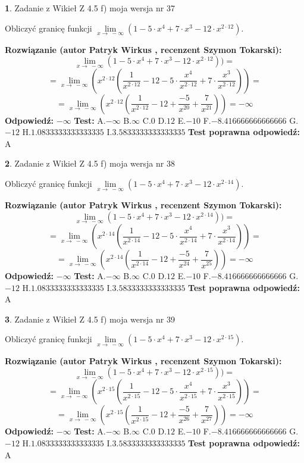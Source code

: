 \documentclass[12pt, a4paper]{article}
\theoremstyle{definition} %
\newtheorem{zad}{}
\newcommand{\zadStart}[1]{\begin{zad}#1\newline}
\newcommand{\zadStop}{\end{zad}}
\newcommand{\rozwStart}[2]{\noindent \textbf{Rozwiązanie (autor #1 , recenzent #2): }\newline}
\newcommand{\rozwStop}{\newline}
\newcommand{\odpStart}{\noindent \textbf{Odpowiedź:}\newline}
\newcommand{\odpStop}{\newline}
\newcommand{\testStart}{\noindent \textbf{Test:}\newline}
\newcommand{\testStop}{\newline}
\newcommand{\kluczStart}{\noindent \textbf{Test poprawna odpowiedź:}\newline}
\newcommand{\kluczStop}{\newline}
\begin{document}
\zadStart{Zadanie z Wikieł Z 4.5 f) moja wersja nr 37}


Obliczyć granicę funkcji  $\lim\limits_{x\to\ -\infty}(1 - 5 \cdot x^{4}+7 \cdot x^{3}- 12 \cdot x^{2\cdot12})$.
\zadStop
\rozwStart{Patryk Wirkus}{Szymon Tokarski}
$$\lim\limits_{x\to\ -\infty}(1 - 5 \cdot x^{4}+7 \cdot x^{3}- 12 \cdot x^{2\cdot12}))=$$
$$=\lim\limits_{x\to\ -\infty}(x^{2\cdot12}(\frac{1}{x^{2\cdot12}}-12 -5 \cdot \frac{x^{4}}{x^{2\cdot12}}+7 \cdot \frac{x^{3}}{x^{2\cdot12}}))=$$
$$=\lim\limits_{x\to\ -\infty}(x^{2\cdot12}(\frac{1}{x^{2\cdot12}}-12 + \frac{-5}{x^{20}}+ \frac{7}{x^{21}}))=-\infty$$
\rozwStop
\odpStart
$-\infty$
\odpStop
\testStart
A.$-\infty$ B.$\infty$ C.$0$ D.$12$ E.$-10$
F.$-8.416666666666666$ G.$-12$
H.$1.0833333333333335$
I.$3.5833333333333335$
\testStop
\kluczStart
A
\kluczStop



\zadStart{Zadanie z Wikieł Z 4.5 f) moja wersja nr 38}


Obliczyć granicę funkcji  $\lim\limits_{x\to\ -\infty}(1 - 5 \cdot x^{4}+7 \cdot x^{3}- 12 \cdot x^{2\cdot14})$.
\zadStop
\rozwStart{Patryk Wirkus}{Szymon Tokarski}
$$\lim\limits_{x\to\ -\infty}(1 - 5 \cdot x^{4}+7 \cdot x^{3}- 12 \cdot x^{2\cdot14}))=$$
$$=\lim\limits_{x\to\ -\infty}(x^{2\cdot14}(\frac{1}{x^{2\cdot14}}-12 -5 \cdot \frac{x^{4}}{x^{2\cdot14}}+7 \cdot \frac{x^{3}}{x^{2\cdot14}}))=$$
$$=\lim\limits_{x\to\ -\infty}(x^{2\cdot14}(\frac{1}{x^{2\cdot14}}-12 + \frac{-5}{x^{24}}+ \frac{7}{x^{25}}))=-\infty$$
\rozwStop
\odpStart
$-\infty$
\odpStop
\testStart
A.$-\infty$ B.$\infty$ C.$0$ D.$12$ E.$-10$
F.$-8.416666666666666$ G.$-12$
H.$1.0833333333333335$
I.$3.5833333333333335$
\testStop
\kluczStart
A
\kluczStop



\zadStart{Zadanie z Wikieł Z 4.5 f) moja wersja nr 39}


Obliczyć granicę funkcji  $\lim\limits_{x\to\ -\infty}(1 - 5 \cdot x^{4}+7 \cdot x^{3}- 12 \cdot x^{2\cdot15})$.
\zadStop
\rozwStart{Patryk Wirkus}{Szymon Tokarski}
$$\lim\limits_{x\to\ -\infty}(1 - 5 \cdot x^{4}+7 \cdot x^{3}- 12 \cdot x^{2\cdot15}))=$$
$$=\lim\limits_{x\to\ -\infty}(x^{2\cdot15}(\frac{1}{x^{2\cdot15}}-12 -5 \cdot \frac{x^{4}}{x^{2\cdot15}}+7 \cdot \frac{x^{3}}{x^{2\cdot15}}))=$$
$$=\lim\limits_{x\to\ -\infty}(x^{2\cdot15}(\frac{1}{x^{2\cdot15}}-12 + \frac{-5}{x^{26}}+ \frac{7}{x^{27}}))=-\infty$$
\rozwStop
\odpStart
$-\infty$
\odpStop
\testStart
A.$-\infty$ B.$\infty$ C.$0$ D.$12$ E.$-10$
F.$-8.416666666666666$ G.$-12$
H.$1.0833333333333335$
I.$3.5833333333333335$
\testStop
\kluczStart
A
\kluczStop
\end{document}
